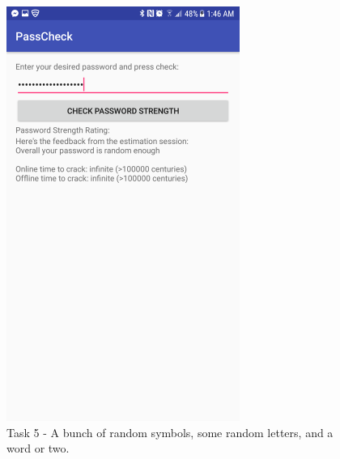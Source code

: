 \documentclass{article}
\begin{document}
	\begin{figure}[ht]
        \centerline{
            \includegraphics[width=3in]{img/t5s5.png}
        }
		\centering
		\caption{Task 5 - A bunch of random symbols, some random letters, and a word or two.}
	\end{figure}
\end{document}
